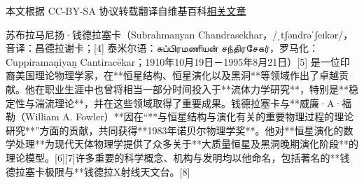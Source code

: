 
本文根据 CC-BY-SA 协议转载翻译自维基百科\href{https://en.wikipedia.org/wiki/Subrahmanyan_Chandrasekhar}{相关文章}

苏布拉马尼扬·钱德拉塞卡（Subrahmanyan Chandrasekhar，/ˌtʃəndrəˈʃeɪkər/，音译：昌德拉谢卡；[4] 泰米尔语：சுப்பிரமணியன் சந்திரசேகர்，罗马化：Cuppiramaṇiyaṉ Cantiracēkar；1910年10月19日－1995年8月21日）[5] 是一位印裔美国理论物理学家，在**恒星结构、恒星演化以及黑洞**等领域作出了卓越贡献。他在职业生涯中也曾将相当一部分时间投入于**流体力学研究**，特别是**稳定性与湍流理论**，并在这些领域取得了重要成果。钱德拉塞卡与**威廉·A·福勒（William A. Fowler）**因在“**与恒星结构与演化有关的重要物理过程的理论研究**”方面的贡献，共同获得**1983年诺贝尔物理学奖**。他对**恒星演化的数学处理**为现代天体物理学提供了众多关于**大质量恒星及黑洞晚期演化阶段**的理论模型。[6][7]许多重要的科学概念、机构与发明均以他命名，包括著名的**钱德拉塞卡极限与**钱德拉X射线天文台。[8]

